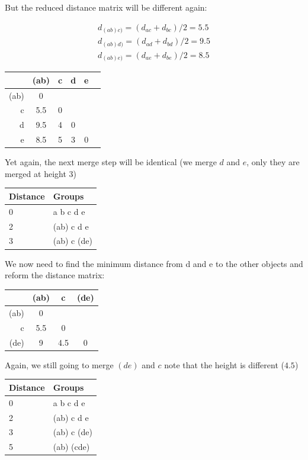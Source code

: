 But the reduced distance matrix will be different again:

\begin{eqnarray*}
d_{(ab)c)} = (d_{ac} + d_{bc})/2  = 5.5\\
d_{(ab)d)} = (d_{ad} + d_{bd})/2  = 9.5\\
d_{(ab)e)} = (d_{ae}+ d_{be})/2  = 8.5
\end{eqnarray*}


\begin{minipage}[c]{0.5\textwidth}
\begin{tabular}{r|ccccc}
 & (ab) & c & d & e\\
\hline
(ab) & 0  &   &   &  \\
c    & 5.5  & 0 &   &  \\
d    & 9.5 & 4 & 0 &  \\
e    & 8.5  & 5 & 3 & 0\\
\end{tabular}
\end{minipage}
\begin{minipage}[c]{0.5\textwidth}
Yet again, the next merge step will be identical (we merge $d$ and $e$, only they are merged at height 3)

\begin{tabular}{ll}
Distance & Groups\\
\hline
0 & a b c d e\\
2 & (ab) c d e\\
3 & (ab) c (de)
\end{tabular}
\end{minipage}

We now need to find the minimum distance from d and e to the other objects and reform the distance matrix:

\begin{minipage}[c]{0.5\textwidth}
\begin{tabular}{r|ccc}
 & (ab) & c & (de)\\
\hline
(ab) & 0 &   &    \\
c    & 5.5 & 0 &   \\
(de) & 9 & 4.5 & 0  \\
\end{tabular}
\end{minipage}
\begin{minipage}[c]{0.5\textwidth}
Again, we still going to merge $(de)$ and $c$ note that the height is different ($4.5$)

\begin{tabular}{ll}
Distance & Groups\\
\hline
0 & a b c d e\\
2 & (ab) c d e\\
3 & (ab) c (de)\\
5 & (ab) (cde)
\end{tabular}
\end{minipage}

